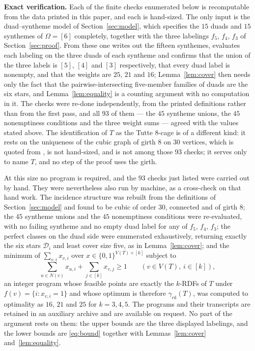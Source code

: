 \documentclass[11pt]{amsart}
\begin{document}
\medskip
\noindent\textbf{Exact verification.}
Each of the finite checks enumerated below is recomputable from the data
printed in this paper, and each is hand-sized. The only input is the
duad--syntheme model of Section~\ref{sec:model}, which specifies the $15$
duads and $15$ synthemes of $\Omega=[6]$ completely, together with the
three labelings
$f_5$, $f_4$, $f_3$ of Section~\ref{sec:proof}. From these one writes out
the fifteen synthemes, evaluates each labeling
on the three duads of each syntheme and confirms that the union of the
three labels is $[5]$, $[4]$ and $[3]$ respectively, that every duad
label is nonempty, and that the weights are $25$, $21$ and $16$;
Lemma~\ref{lem:cover} then needs only the fact that the
pairwise-intersecting five-member families of duads are the six stars,
and Lemma~\ref{lem:equality} is a counting argument with no computation
in it. The checks were re-done independently, from the printed
definitions rather than from the first pass, and all $93$ of them --- the
$45$ syntheme unions, the $45$ nonemptiness conditions and the three
weight sums --- agreed with the values stated above. The identification of
$T$ as the Tutte $8$-cage is of a different kind: it rests on the
uniqueness of the cubic graph of girth $8$ on $30$ vertices, which is
quoted from \cite{Coxeter1950}, is not hand-sized, and is not among those
$93$ checks; it serves only to name $T$, and no step of the proof uses the
girth.

At this size no program is required, and the $93$ checks just listed were
carried out by hand. They were nevertheless also run by machine, as a
cross-check on that hand work. The incidence structure was rebuilt from
the definitions of Section~\ref{sec:model} and found to be cubic of order
$30$, connected and of girth $8$; the $45$ syntheme unions and the $45$
nonemptiness conditions were re-evaluated, with no failing syntheme and no
empty duad label for any of $f_5$, $f_4$, $f_3$; the perfect classes on
the duad side were enumerated exhaustively, returning exactly the six
stars $\mathcal D_i$ and least cover size five, as in
Lemma~\ref{lem:cover}; and the minimum of $\sum_{v,i}x_{v,i}$ over
$x\in\{0,1\}^{V(T)\times[k]}$ subject to
\[
  \sum_{u\in N(v)}x_{u,i}+\sum_{j\in[k]}x_{v,j}\geq1
  \qquad (v\in V(T),\ i\in[k]),
\]
an integer program whose feasible points are exactly the $k$-RDFs of $T$
under $f(v)=\{i:x_{v,i}=1\}$ and whose optimum is therefore
$\gamma_{rk}(T)$, was computed to optimality as $16$, $21$ and $25$ for
$k=3,4,5$. The programs and their transcripts are retained in an auxiliary
archive and are available on request. No part of the argument rests on
them: the upper bounds are the three displayed labelings, and the lower
bounds are \eqref{eq:bound} together with Lemmas~\ref{lem:cover}
and~\ref{lem:equality}.
\end{document}
